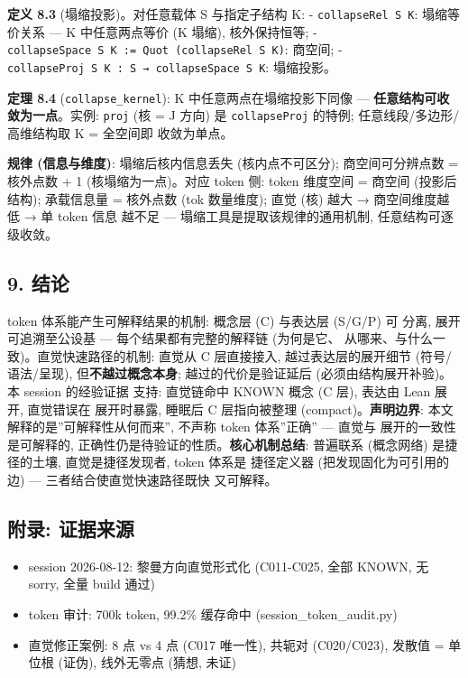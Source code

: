 \documentclass[
]{article}
\providecommand{\tightlist}{%
  \setlength{\itemsep}{0pt}\setlength{\parskip}{0pt}}
\begin{document}
\textbf{定义 8.3} (塌缩投影)。对任意载体 S 与指定子结构 K: -
\texttt{collapseRel\ S\ K}: 塌缩等价关系 --- K 中任意两点等价 (K 塌缩),
核外保持恒等; -
\texttt{collapseSpace\ S\ K\ :=\ Quot\ (collapseRel\ S\ K)}: 商空间; -
\texttt{collapseProj\ S\ K\ :\ S\ →\ collapseSpace\ S\ K}: 塌缩投影。

\textbf{定理 8.4} (\texttt{collapse\_kernel}): K
中任意两点在塌缩投影下同像 --- \textbf{任意结构可收敛为一点}。实例:
\texttt{proj} (核 = J 方向) 是 \texttt{collapseProj} 的特例;
任意线段/多边形/高维结构取 K = 全空间即 收敛为单点。

\textbf{规律 (信息与维度)}: 塌缩后核内信息丢失 (核内点不可区分);
商空间可分辨点数 = 核外点数 + 1 (核塌缩为一点)。对应 token 侧: token
维度空间 = 商空间 (投影后结构); 承载信息量 = 核外点数 (tok 数量维度);
直觉 (核) 越大 → 商空间维度越低 → 单 token 信息 越不足 ---
塌缩工具是提取该规律的通用机制, 任意结构可逐级收敛。

\subsection{9. 结论}\label{ux7ed3ux8bba}

token 体系能产生可解释结果的机制: 概念层 (C) 与表达层 (S/G/P) 可 分离,
展开可追溯至公设基 --- 每个结果都有完整的解释链 (为何是它、
从哪来、与什么一致)。直觉快速路径的机制: 直觉从 C 层直接接入,
越过表达层的展开细节 (符号/语法/呈现), 但\textbf{不越过概念本身};
越过的代价是验证延后 (必须由结构展开补验)。本 session 的经验证据 支持:
直觉链命中 KNOWN 概念 (C 层), 表达由 Lean 展开, 直觉错误在 展开时暴露,
睡眠后 C 层指向被整理 (compact)。\textbf{声明边界}: 本文
解释的是''可解释性从何而来'', 不声称 token 体系''正确'' --- 直觉与
展开的一致性是可解释的, 正确性仍是待验证的性质。\textbf{核心机制总结}:
普遍联系 (概念网络) 是捷径的土壤, 直觉是捷径发现者, token 体系是
捷径定义器 (把发现固化为可引用的边) --- 三者结合使直觉快速路径既快
又可解释。

\subsection{附录: 证据来源}\label{ux9644ux5f55-ux8bc1ux636eux6765ux6e90}

\begin{itemize}
\tightlist
\item
  session 2026-08-12: 黎曼方向直觉形式化 (C011-C025, 全部 KNOWN, 无
  sorry, 全量 build 通过)
\item
  token 审计: 700k token, 99.2\% 缓存命中 (session\_token\_audit.py)
\item
  直觉修正案例: 8 点 vs 4 点 (C017 唯一性), 共轭对 (C020/C023), 发散值 =
  单位根 (证伪), 线外无零点 (猜想, 未证)
\end{itemize}
\end{document}
